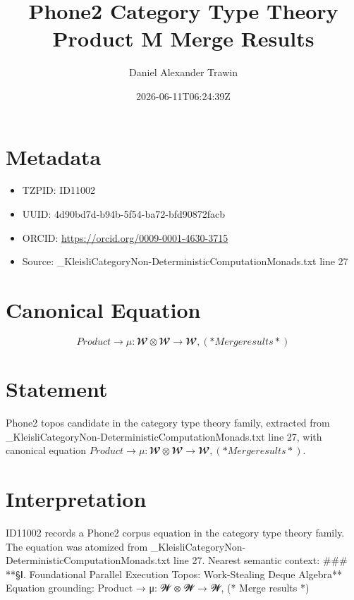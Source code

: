 \documentclass[11pt]{article}
\title{Phone2 Category Type Theory Product Μ Merge Results}
\author{Daniel Alexander Trawin}
\date{2026-06-11T06:24:39Z}
\begin{document}
\maketitle
\section*{Metadata}
\begin{itemize}
\item TZPID: ID11002
\item UUID: 4d90bd7d-b94b-5f54-ba72-bfd90872facb
\item ORCID: \url{https://orcid.org/0009-0001-4630-3715}
\item Source: _KleisliCategoryNon-DeterministicComputationMonads.txt line 27
\end{itemize}
\section*{Canonical Equation}
\[
Product → μ: 𝓦 ⊗ 𝓦 → 𝓦, (* Merge results *)
\]
\section*{Statement}
Phone2 topos candidate in the category type theory family, extracted from _KleisliCategoryNon-DeterministicComputationMonads.txt line 27, with canonical equation $Product → μ: 𝓦 ⊗ 𝓦 → 𝓦, (* Merge results *)$.
\section*{Interpretation}
ID11002 records a Phone2 corpus equation in the category type theory family. The equation was atomized from _KleisliCategoryNon-DeterministicComputationMonads.txt line 27. Nearest semantic context: ### **§Ⅰ. Foundational Parallel Execution Topos: Work-Stealing Deque Algebra** Equation grounding: Product → μ: 𝓦 ⊗ 𝓦 → 𝓦, (* Merge results *)
\end{document}
